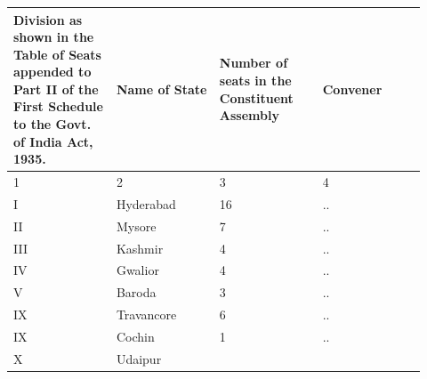 \par\medskip
\begin{longtable}{|p{0.23\linewidth}|p{0.23\linewidth}|p{0.23\linewidth}|p{0.23\linewidth}|}
\hline
Division as shown in the Table of Seats appended to Part II of the First Schedule to the Govt. of India Act, 1935.

 & Name of State

 & Number of seats in the Constituent Assembly

 & Convener

 \\
\hline
1

 & 2

 & 3

 & 4

 \\
\hline
I

 & Hyderabad

 & 16

 & ..

 \\
\hline
II

 & Mysore

 & 7

 & ..

 \\
\hline
III

 & Kashmir

 & 4

 & ..

 \\
\hline
IV

 & Gwalior

 & 4

 & ..

 \\
\hline
V

 & Baroda

 & 3

 & ..

 \\
\hline
IX

 & Travancore

 & 6

 & ..

 \\
\hline
IX

 & Cochin

 & 1

 & ..

 \\
\hline
X

 & Udaipur


\end{longtable}

